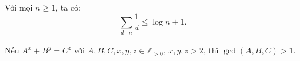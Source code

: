 \documentclass[../imo-training-open-book.tex]{subfiles}
\begin{document}
\vspace{1em}

\begin{theorem}
    \label{theorem:sum-of-divisors-harmonic}
    Với mọi \( n \ge 1 \), ta có:
    \[
        \sum_{d \mid n} \frac{1}{d} \le \log n + 1.
    \]
\end{theorem}

\begin{theorem}
    \label{theorem:beal-conjecture}
    Nếu \( A^x + B^y = C^z \) với \( A, B, C, x, y, z \in \mathbb{Z}_{>0} \), \( x, y, z > 2 \), thì \( \gcd(A, B, C) > 1 \).
\end{theorem}
\end{document}
